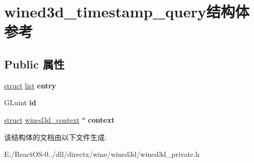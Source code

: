 \hypertarget{structwined3d__timestamp__query}{}\section{wined3d\+\_\+timestamp\+\_\+query结构体 参考}
\label{structwined3d__timestamp__query}
\subsection*{Public 属性}
\begin{DoxyCompactItemize}
\item 
\mbox{\label{structwined3d__timestamp__query_ac6fe1b7d65112d26c61d6be6fc85a97d}} 
\hyperlink{interfacestruct}{struct} \hyperlink{classlist}{list} {\bfseries entry}
\item 
\mbox{\label{structwined3d__timestamp__query_a62804002b680ef072776fb3ce595c09d}} 
G\+Luint {\bfseries id}
\item 
\mbox{\label{structwined3d__timestamp__query_acd22270494c059e18ff42a048a0bf574}} 
\hyperlink{interfacestruct}{struct} \hyperlink{structwined3d__context}{wined3d\+\_\+context} $\ast$ {\bfseries context}
\end{DoxyCompactItemize}


该结构体的文档由以下文件生成\+:\begin{DoxyCompactItemize}
\item 
E\+:/\+React\+O\+S-\/0../dll/directx/wine/wined3d/wined3d\+\_\+private.\+h\end{DoxyCompactItemize}
